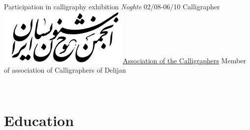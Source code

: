 \documentclass[a4paper]{./classes/friggeri-cv}
\begin{document}
\begin{entrylist}
        {Participation in calligraphy exhibition \emph{Noghte}}
        \entry
        {02/08-06/10}
        {   Calligrapher}
        {\href{http://calligraphers.ir/}{\includegraphics[scale=0.15]{../assets/images/logos/Khoshnevisan_logo.png}Association of the Calligraphers}}
        {Member of association of Calligraphers of Delijan}
    \end{entrylist}
    \\
    \section{Education}\label{sec:education}
\end{document}
